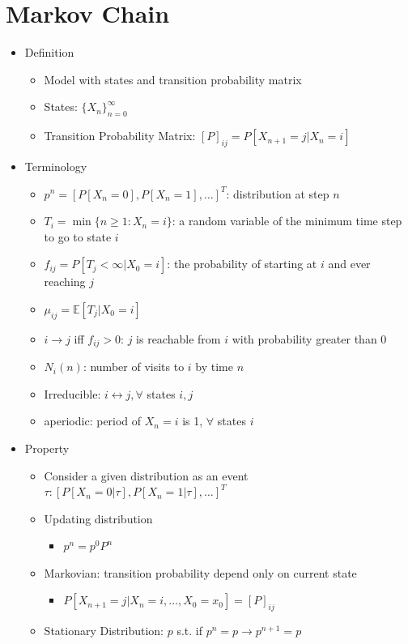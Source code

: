 \documentclass[a4paper]{article}
\begin{document}
\section{Markov Chain}
\begin{itemize}
    \item Definition
        \begin{itemize}
            \item Model with states and transition probability matrix
            \item States: $\{X_n\}_{n=0}^\infty$
            \item Transition Probability Matrix: $[P]_{ij} = P[X_{n+1} = j|X_n = i]$
        \end{itemize}
    \item Terminology
        \begin{itemize}
            \item $p^n = [P[X_n = 0], P[X_n = 1], \dots]^T$: distribution at step $n$
            \item $T_i = \min\{n \geq 1: X_n = i\}$: a random variable of the minimum time step to go to state $i$
            \item $f_{ij} = P[T_j < \infty | X_0 = i]$: the probability of starting at $i$ and ever reaching $j$
            \item $\mu_{ij} = \mathbb{E}[T_j | X_0 = i]$
            \item $i \rightarrow j$ iff $f_{ij} > 0$: $j$ is reachable from $i$ with probability greater than 0
            \item $N_i(n)$: number of visits to $i$ by time $n$
            \item Irreducible: $i \leftrightarrow j, \forall$ states $i, j$
            \item aperiodic: period of $X_n = i$ is 1, $\forall$ states $i$
        \end{itemize}
    \item Property
        \begin{itemize}
            \item Consider a given distribution as an event $\tau: [P[X_n = 0| \tau], P[X_n = 1| \tau], \dots]^T$
            \item Updating distribution
                \begin{itemize}
                    \item $p^n = p^0 P^n$
                \end{itemize}
            \item Markovian: transition probability depend only on current state
                \begin{itemize}
                    \item $P[X_{n+1} = j|X_n = i, \dots, X_0 = x_0] = [P]_{ij}$
                \end{itemize}
            \item Stationary Distribution: $p$ s.t. if $p^n = p \rightarrow p^{n+1} = p$


\end{itemize}
\end{itemize}
\end{document}
